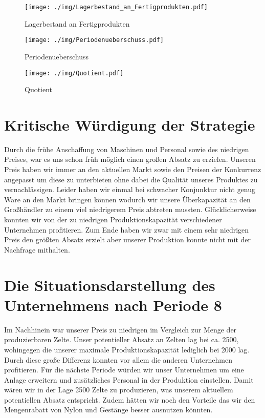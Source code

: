\documentclass[a4paper, 12pt]{report}
\begin{document}
\begin{flushleft}
 \begin{figure}
 \centering 
 \texttt{[image: ./img/Lagerbestand\_an\_Fertigprodukten.pdf]}
  \caption[Lagerbestand an Fertigprodukten]{Lagerbestand an Fertigprodukten}
\end{figure}

\begin{figure}
 \centering 
 \texttt{[image: ./img/Periodenueberschuss.pdf]}
  \caption[Periodenueberschuss]{Periodenueberschuss}
\end{figure}
 
 \begin{figure}[b]
 \centering 
 \texttt{[image: ./img/Quotient.pdf]}
  \caption[Quotient]{Quotient}
\end{figure}



\chapter{Kritische Würdigung der Strategie}
Durch die frühe Anschaffung von Maschinen und Personal sowie des niedrigen Preises, war es uns schon früh möglich einen großen Absatz zu erzielen.
Unseren Preis haben wir immer an den aktuellen Markt sowie den Preisen der Konkurrenz angepasst um diese zu unterbieten ohne dabei die Qualität unseres Produktes zu vernachlässigen.
Leider haben wir einmal bei schwacher Konjunktur nicht genug Ware an den Markt bringen können wodurch wir unsere Überkapazität an den Großhändler zu einem viel niedrigerem Preis abtreten mussten.
Glücklicherweise konnten wir von der zu niedrigen Produktionskapazität verschiedener Unternehmen profitieren.
Zum Ende haben wir zwar mit einem sehr niedrigen Preis den größten Absatz erzielt aber unserer Produktion konnte nicht mit der Nachfrage mithalten.

\chapter{Die Situationsdarstellung des Unternehmens nach Periode 8}  
Im Nachhinein war unserer Preis zu niedrigen im Vergleich zur Menge der produzierbaren Zelte.
Unser potentieller Absatz an Zelten lag bei ca. 2500, wohingegen die unserer maximale Produktionskapazität lediglich bei 2000 lag.
Durch diese große Differenz konnten vor allem die anderen Unternehmen profitieren.
Für die nächste Periode würden wir unser Unternehmen um eine Anlage erweitern und zusätzliches Personal in der Produktion einstellen.
Damit wären wir in der Lage 2500 Zelte zu produzieren, was unserem aktuellem potentiellen Absatz entspricht.
Zudem hätten wir noch den Vorteile das wir den Mengenrabatt von Nylon und Gestänge besser ausnutzen könnten.


\end{flushleft}
\end{document}

